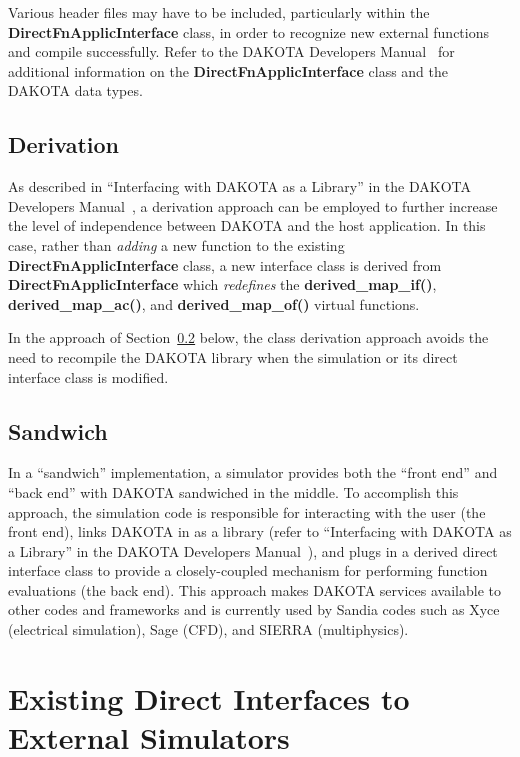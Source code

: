 Various header files may have to be included, particularly within the
\textbf{DirectFnApplicInterface} class, in order to recognize new
external functions and compile successfully. Refer to the DAKOTA
Developers Manual~\cite{DevMan} for additional information on the
\textbf{DirectFnApplicInterface} class and the DAKOTA data types.

\subsection{Derivation}\label{advint:direct:derivation}

As described in ``Interfacing with DAKOTA as a Library'' in the DAKOTA
Developers Manual~\cite{DevMan}, a derivation approach can be employed
to further increase the level of independence between DAKOTA and the
host application.  In this case, rather than \emph{adding} a new
function to the existing \textbf{DirectFnApplicInterface} class, a new
interface class is derived from \textbf{DirectFnApplicInterface} which
\emph{redefines} the \textbf{derived\_map\_if()},
\textbf{derived\_map\_ac()}, and \textbf{derived\_map\_of()} virtual 
functions.

In the approach of Section~\ref{advint:direct:sandwich} below, the 
class derivation approach avoids the need to recompile the DAKOTA 
library when the simulation or its direct interface class is modified.

\subsection{Sandwich}\label{advint:direct:sandwich}

In a ``sandwich'' implementation, a simulator provides both the
``front end'' and ``back end'' with DAKOTA sandwiched in the middle.
To accomplish this approach, the simulation code is responsible for
interacting with the user (the front end), links DAKOTA in as a
library (refer to ``Interfacing with DAKOTA as a Library'' in the
DAKOTA Developers Manual~\cite{DevMan}), and plugs in a derived direct
interface class to provide a closely-coupled mechanism for performing
function evaluations (the back end).  This approach makes DAKOTA
services available to other codes and frameworks and is currently used
by Sandia codes such as Xyce (electrical simulation), Sage (CFD), and
SIERRA (multiphysics).


\section{Existing Direct Interfaces to External Simulators}\label{advint:existingdirect}

